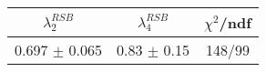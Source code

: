 \begin{tabular}{c|c||c}
$\lambda_{2}^{RSB}$ & $\lambda_4^{RSB}$ & $\chi^{2}$/ndf \\
\hline
0.697 $\pm$ 0.065 & 0.83 $\pm$ 0.15 & 148/99\\
\end{tabular}
